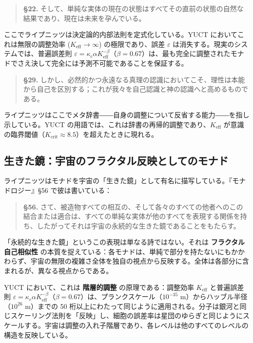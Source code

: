 \documentclass[12pt,a4paper]{article}
\begin{document}
	\begin{quote}
		\textbf{§22.} そして、単純な実体の現在の状態はすべてその直前の状態の自然な結果であり、現在は未来を孕んでいる。
	\end{quote}
	
	ここでライプニッツは決定論的内部法則を定式化している。YUCT においてこれは無限の調整効率 (\(K_{\mathrm{eff}} \to \infty\)) の極限であり、誤差 \(\varepsilon\) は消失する。現実のシステムでは、普遍誤差則 \(\varepsilon = \kappa_c \alpha K_{\mathrm{eff}}^{-\beta}\)（\(\beta=0.67\)）は、最も完全に調整されたモナドでさえ決して完全には予測不可能であることを保証する。
	
	\begin{quote}
		\textbf{§29.} しかし、必然的かつ永遠なる真理の認識においてこそ、理性は本能から自己を区別する；これが我々を自己認識と神の認識へと高めるものである。
	\end{quote}
	
	ライプニッツはここでメタ辞書――自身の調整について反省する能力――を指し示している。YUCT の用語では、これは辞書の再帰的調整であり、\(K_{\mathrm{eff}}\) が意識の臨界閾値（\(K_{\mathrm{crit}} \approx 8.5\)）を超えたときに現れる。
	
	\subsection{生きた鏡：宇宙のフラクタル反映としてのモナド}
	
	ライプニッツはモナドを宇宙の「生きた鏡」として有名に描写している。『モナドロジー』§56 で彼は書いている：
	
	\begin{quote}
		\textbf{§56.} さて、被造物すべての相互の、そして各々のすべての他者へのこの結合または適合は、すべての単純な実体が他のすべてを表現する関係を持ち、したがってそれは宇宙の永続的な生きた鏡であることをもたらす。
	\end{quote}
	
	「永続的な生きた鏡」というこの表現は単なる詩ではない。それは \textbf{フラクタル自己相似性} の本質を捉えている：各モナドは、単純で部分を持たないにもかかわらず、宇宙の無限の複雑さ全体を独自の視点から反映する。全体は各部分に含まれるが、異なる視点からである。
	
	YUCT において、これは \textbf{階層的調整} の原理である：調整効率 \(K_{\mathrm{eff}}\) と普遍誤差則 \(\varepsilon = \kappa_c \alpha K_{\mathrm{eff}}^{-\beta}\)（\(\beta=0.67\)）は、プランクスケール（\(10^{-35}\) m）からハッブル半径（\(10^{26}\) m）までの 50 桁以上にわたって同じように適用される。分子は銀河と同じスケーリング法則を「反映」し、細胞の誤差率は星団のゆらぎと同じようにスケールする。宇宙は調整の入れ子階層であり、各レベルは他のすべてのレベルの構造を反映している。
	
\end{document}
